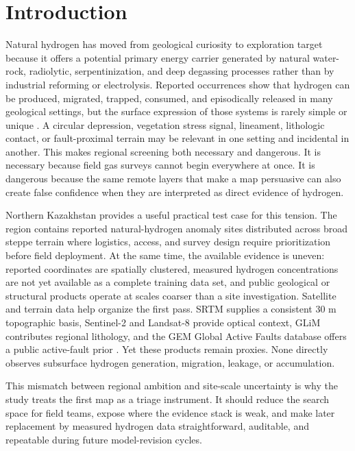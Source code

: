 \documentclass[numrefs]{interact}
\let\cite\citep
\theoremstyle{plain}%
\theoremstyle{definition}
\theoremstyle{remark}
\begin{document}
\section{Introduction}

Natural hydrogen has moved from geological curiosity to exploration target because it offers a potential primary energy carrier generated by natural water-rock, radiolytic, serpentinization, and deep degassing processes rather than by industrial reforming or electrolysis. Reported occurrences show that hydrogen can be produced, migrated, trapped, consumed, and episodically released in many geological settings, but the surface expression of those systems is rarely simple or unique \cite{zgonnik2020occurrence}. A circular depression, vegetation stress signal, lineament, lithologic contact, or fault-proximal terrain may be relevant in one setting and incidental in another. This makes regional screening both necessary and dangerous. It is necessary because field gas surveys cannot begin everywhere at once. It is dangerous because the same remote layers that make a map persuasive can also create false confidence when they are interpreted as direct evidence of hydrogen.

Northern Kazakhstan provides a useful practical test case for this tension. The region contains reported natural-hydrogen anomaly sites distributed across broad steppe terrain where logistics, access, and survey design require prioritization before field deployment. At the same time, the available evidence is uneven: reported coordinates are spatially clustered, measured hydrogen concentrations are not yet available as a complete training data set, and public geological or structural products operate at scales coarser than a site investigation. Satellite and terrain data help organize the first pass. SRTM supplies a consistent 30 m topographic basis, Sentinel-2 and Landsat-8 provide optical context, GLiM contributes regional lithology, and the GEM Global Active Faults database offers a public active-fault prior \cite{farr2007srtm,drusch2012sentinel,roy2014landsat8,hartmann2012glim,styron2020gem}. Yet these products remain proxies. None directly observes subsurface hydrogen generation, migration, leakage, or accumulation.

This mismatch between regional ambition and site-scale uncertainty is why the study treats the first map as a triage instrument. It should reduce the search space for field teams, expose where the evidence stack is weak, and make later replacement by measured hydrogen data straightforward, auditable, and repeatable during future model-revision cycles.
\end{document}
